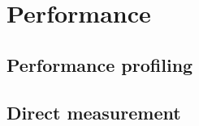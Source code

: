 \chapter{Performance}
\label{ch:performance} %




\section{Performance profiling}
\label{sec:performance-profiling} %


\section{Direct measurement}
\label{sec:direct-measurement} %

